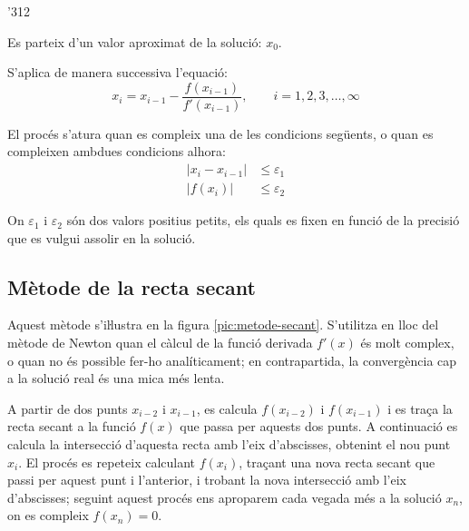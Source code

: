 \begin{dingautolist}{'312}
    \item Es parteix d'un valor aproximat de la solució: $x_0$.

    \item   S'aplica de manera successiva l'equació:
            \begin{equation}\label{eq:newton}
              x_i = x_{i-1} - \frac{f(x_{i-1})}{f'(x_{i-1})}, \qquad i=1,2,3,\dots,\infty
            \end{equation}

    \item   El procés s'atura quan es compleix una de les condicions següents, o quan es compleixen ambdues condicions alhora:
            \begin{subequations}\begin{align}
              |x_i - x_{i-1}| &\leq \varepsilon_1 \\
              |f(x_i)| &\leq \varepsilon_2
            \end{align}\end{subequations}

            On $\varepsilon_1$ i $\varepsilon_2$ són dos valors positius petits, els quals es fixen en funció de la precisió que es vulgui assolir en la solució.
\end{dingautolist}



\subsection{Mètode de la recta secant}

Aquest mètode s'iŀlustra en la figura \vref{pic:metode-secant}. S'utilitza en lloc del mètode de Newton quan el càlcul de  la funció derivada $f'(x)$ és molt complex, o quan no és possible fer-ho analíticament; en contrapartida, la convergència cap a la solució real és una
mica més lenta.

A partir de dos punts $x_{i-2}$ i $x_{i-1}$, es calcula $f(x_{i-2})$ i $f(x_{i-1})$ i es traça la recta secant a la funció $f(x)$ que passa per aquests dos punts. A continuació es calcula la intersecció d'aquesta recta amb l'eix d'abscisses, obtenint el nou punt $x_i$. El procés es repeteix calculant $f(x_i)$, traçant una nova recta secant que passi per aquest punt i l'anterior, i trobant la nova intersecció amb l'eix d'abscisses; seguint aquest procés ens aproparem cada vegada més a la solució $x_n$, on es compleix $f(x_n)=0$.

